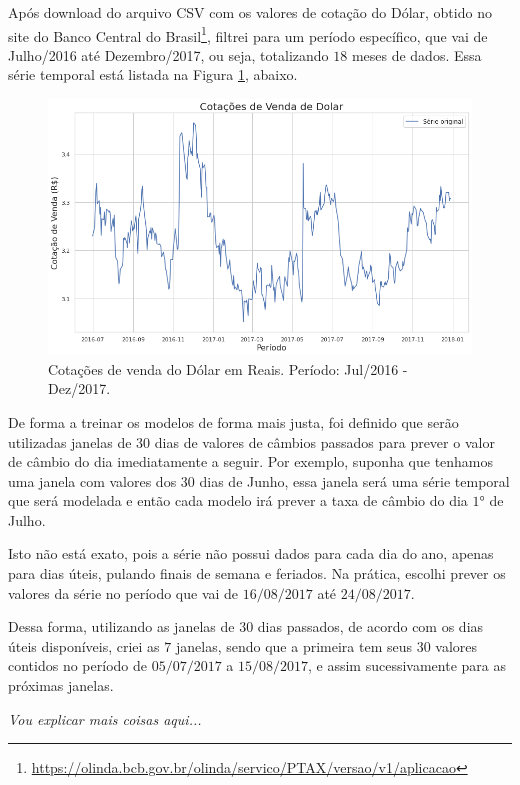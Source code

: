 Após download do arquivo CSV com os valores de cotação do Dólar, obtido no site do Banco Central do Brasil\footnote{\url{https://olinda.bcb.gov.br/olinda/servico/PTAX/versao/v1/aplicacao}}, filtrei para um período específico, que vai de Julho/2016 até Dezembro/2017, ou seja, totalizando $18$ meses de dados. Essa série temporal está listada na Figura \ref{fig:serie_1}, abaixo.

\begin{figure}[htb]
\centering
\includegraphics[width=14cm]{figuras/serie_1}
\caption{Cotações de venda do Dólar em Reais. Período: Jul/2016 - Dez/2017.}
\label{fig:serie_1}
\end{figure}

De forma a treinar os modelos de forma mais justa, foi definido que serão utilizadas janelas de $30$ dias de valores de câmbios passados para prever o valor de câmbio do dia imediatamente a seguir. Por exemplo, suponha que tenhamos uma janela com valores dos $30$ dias de Junho, essa janela será uma série temporal que será modelada e então cada modelo irá prever a taxa de câmbio do dia $1$° de Julho.

Isto não está exato, pois a série não possui dados para cada dia do ano, apenas para dias úteis, pulando finais de semana e feriados. Na prática, escolhi prever os valores da série no período que vai de $16/08/2017$ até $24/08/2017$. 

Dessa forma, utilizando as janelas de $30$ dias passados, de acordo com os dias úteis disponíveis, criei as $7$ janelas, sendo que a primeira tem seus $30$ valores contidos no período de $05/07/2017$ a $15/08/2017$, e assim sucessivamente para as próximas janelas.

\emph{Vou explicar mais coisas aqui...}

